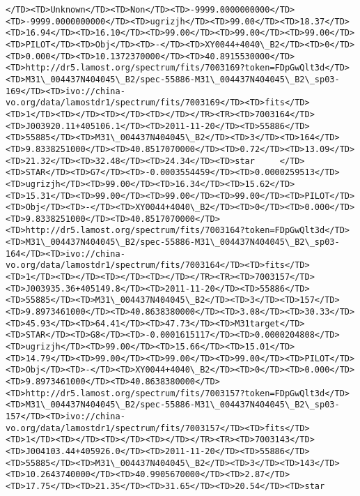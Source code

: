 \documentclass[11pt]{article}
\begin{document}
\begin{Verbatim}[commandchars=\\\{\}]
</TD><TD>Unknown</TD><TD>Non</TD><TD>-9999.0000000000</TD><TD>-9999.0000000000</TD><TD>ugrizjh</TD><TD>99.00</TD><TD>18.37</TD><TD>16.94</TD><TD>16.10</TD><TD>99.00</TD><TD>99.00</TD><TD>99.00</TD><TD>PILOT</TD><TD>Obj</TD><TD>-</TD><TD>XY0044+4040\_B2</TD><TD>0</TD><TD>0.000</TD><TD>10.1372370000</TD><TD>40.8915530000</TD><TD>http://dr5.lamost.org/spectrum/fits/7003169?token=FDpGwQlt3d</TD><TD>M31\_004437N404045\_B2/spec-55886-M31\_004437N404045\_B2\_sp03-169</TD><TD>ivo://china-vo.org/data/lamostdr1/spectrum/fits/7003169</TD><TD>fits</TD><TD>1</TD><TD></TD><TD></TD><TD></TD></TR><TR><TD>7003164</TD><TD>J003920.11+405106.1</TD><TD>2011-11-20</TD><TD>55886</TD><TD>55885</TD><TD>M31\_004437N404045\_B2</TD><TD>3</TD><TD>164</TD><TD>9.8338251000</TD><TD>40.8517070000</TD><TD>0.72</TD><TD>13.09</TD><TD>21.32</TD><TD>32.48</TD><TD>24.34</TD><TD>star     </TD><TD>STAR</TD><TD>G7</TD><TD>-0.0003554459</TD><TD>0.0000259513</TD><TD>ugrizjh</TD><TD>99.00</TD><TD>16.34</TD><TD>15.62</TD><TD>15.31</TD><TD>99.00</TD><TD>99.00</TD><TD>99.00</TD><TD>PILOT</TD><TD>Obj</TD><TD>-</TD><TD>XY0044+4040\_B2</TD><TD>0</TD><TD>0.000</TD><TD>9.8338251000</TD><TD>40.8517070000</TD><TD>http://dr5.lamost.org/spectrum/fits/7003164?token=FDpGwQlt3d</TD><TD>M31\_004437N404045\_B2/spec-55886-M31\_004437N404045\_B2\_sp03-164</TD><TD>ivo://china-vo.org/data/lamostdr1/spectrum/fits/7003164</TD><TD>fits</TD><TD>1</TD><TD></TD><TD></TD><TD></TD></TR><TR><TD>7003157</TD><TD>J003935.36+405149.8</TD><TD>2011-11-20</TD><TD>55886</TD><TD>55885</TD><TD>M31\_004437N404045\_B2</TD><TD>3</TD><TD>157</TD><TD>9.8973461000</TD><TD>40.8638380000</TD><TD>3.08</TD><TD>30.33</TD><TD>45.93</TD><TD>64.41</TD><TD>47.73</TD><TD>M31target</TD><TD>STAR</TD><TD>G8</TD><TD>-0.0001615117</TD><TD>0.0000204808</TD><TD>ugrizjh</TD><TD>99.00</TD><TD>15.66</TD><TD>15.01</TD><TD>14.79</TD><TD>99.00</TD><TD>99.00</TD><TD>99.00</TD><TD>PILOT</TD><TD>Obj</TD><TD>-</TD><TD>XY0044+4040\_B2</TD><TD>0</TD><TD>0.000</TD><TD>9.8973461000</TD><TD>40.8638380000</TD><TD>http://dr5.lamost.org/spectrum/fits/7003157?token=FDpGwQlt3d</TD><TD>M31\_004437N404045\_B2/spec-55886-M31\_004437N404045\_B2\_sp03-157</TD><TD>ivo://china-vo.org/data/lamostdr1/spectrum/fits/7003157</TD><TD>fits</TD><TD>1</TD><TD></TD><TD></TD><TD></TD></TR><TR><TD>7003143</TD><TD>J004103.44+405926.0</TD><TD>2011-11-20</TD><TD>55886</TD><TD>55885</TD><TD>M31\_004437N404045\_B2</TD><TD>3</TD><TD>143</TD><TD>10.2643740000</TD><TD>40.9905670000</TD><TD>2.87</TD><TD>17.75</TD><TD>21.35</TD><TD>31.65</TD><TD>20.54</TD><TD>star     
\end{Verbatim}
\end{document}
